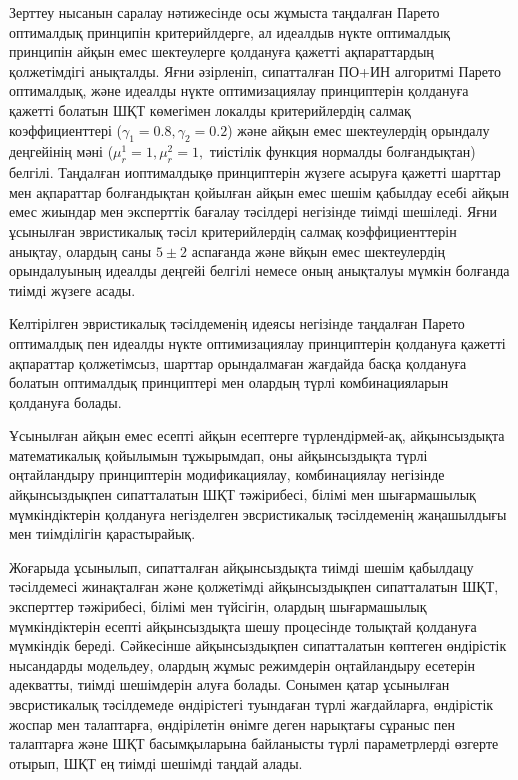 Зерттеу нысанын саралау нәтижесінде осы жұмыста таңдалған Парето
оптималдық принципін критерийлдерге, ал идеалдыв нүкте оптималдық
принципін айқын емес шектеулерге қолдануға қажетті ақпараттардың
қолжетімдігі анықталды. Яғни әзірленіп, сипатталған ПО+ИН алгоритмі
Парето оптималдық, және идеалды нүкте оптимизациялау принциптерін
қолдануға қажетті болатын ШҚТ көмегімен локалды критерийлердің салмақ
коэффициенттері ($\gamma_1=0.8,\gamma_2=0.2$) және айқын емес
шектеулердің орындалу деңгейінің мәні
($\mu_r^1=1,\mu_r^2=1,$ тиістілік функция нормалды
болғандықтан) белгілі. Таңдалған иоптималдықө принциптерін жүзеге
асыруға қажетті шарттар мен ақпараттар болғандықтан қойылған айқын емес
шешім қабылдау есебі айқын емес жиындар мен эксперттік бағалау тәсілдері
негізінде тиімді шешіледі. Яғни ұсынылған эвристикалық тәсіл
критерийлердің салмақ коэффициенттерін анықтау, олардың саны
$5\pm2$ аспағанда және вйқын емес
шектеулердің орындалуының идеалды деңгейі белгілі немесе оның анықталуы
мүмкін болғанда тиімді жүзеге асады.

Келтірілген эвристикалық тәсілдеменің идеясы негізінде таңдалған Парето
оптималдық пен идеалды нүкте оптимизациялау принциптерін қолдануға
қажетті ақпараттар қолжетімсыз, шарттар орындалмаған жағдайда басқа
қолдануға болатын оптималдық принциптері мен олардың түрлі
комбинацияларын қолдануға болады.

Ұсынылған айқын емес есепті айқын есептерге түрлендірмей-ақ,
айқынсыздықта математикалық қойылымын тұжырымдап, оны айқынсыздықта
түрлі оңтайландыру принциптерін модификациялау, комбинациялау негізінде
айқынсыздықпен сипатталатын ШҚТ тәжірибесі, білімі мен шығармашылық
мүмкіндіктерін қолдануға негізделген эвсристикалық тәсілдеменің
жаңашылдығы мен тиімділігін қарастырайық.

Жоғарыда ұсынылып, сипатталған айқынсыздықта тиімді шешім қабылдацу
тәсілдемесі жинақталған және қолжетімді айқынсыздықпен сипатталатын ШҚТ,
эксперттер тәжірибесі, білімі мен түйсігін, олардың шығармашылық
мүмкіндіктерін есепті айқынсыздықта шешу процесінде толықтай қолдануға
мүмкіндік береді. Сәйкесінше айқынсыздықпен сипатталатын көптеген
өндірістік нысандарды модельдеу, олардың жұмыс режимдерін оңтайландыру
есетерін адекватты, тиімді шешімдерін алуға болады. Сонымен қатар
ұсынылған эвсристикалық тәсілдемеде өндірістегі туындаған түрлі
жағдайларға, өндірістік жоспар мен талаптарға, өндірілетін өнімге деген
нарықтағы сұраныс пен талаптарға және ШҚТ басымқыларына байланысты түрлі
параметрлерді өзгерте отырып, ШҚТ ең тиімді шешімді таңдай алады.

